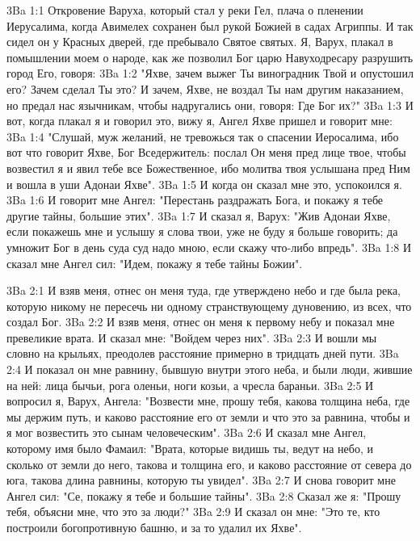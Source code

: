 \vs 3Ba 1:1
Откровение Варуха, который стал у реки Гел, плача о пленении Иерусалима, когда Авимелех сохранен был рукой Божией в садах Агриппы. И так сидел он у Красных дверей, где пребывало Святое святых. Я, Варух, плакал в помышлении моем о народе, как же позволил Бог царю Навуходресару разрушить город Его, говоря:
\vs 3Ba 1:2
"Яхве, зачем выжег Ты виноградник Твой и опустошил его? Зачем сделал Ты это? И зачем, Яхве, не воздал Ты нам другим наказанием, но предал нас язычникам, чтобы надругались они, говоря: Где Бог их?"
\vs 3Ba 1:3
И вот, когда плакал я и говорил это, вижу я, Ангел Яхве пришел и говорит мне:
\vs 3Ba 1:4
"Слушай, муж желаний, не тревожься так о спасении Иеросалима, ибо вот что говорит Яхве, Бог Вседержитель: послал Он меня пред лице твое, чтобы возвестил я и явил тебе все Божественное, ибо молитва твоя услышана пред Ним и вошла в уши Адонаи Яхве".
\vs 3Ba 1:5
И когда он сказал мне это, успокоился я.
\vs 3Ba 1:6
И говорит мне Ангел: "Перестань раздражать Бога, и покажу я тебе другие тайны, большие этих".
\vs 3Ba 1:7
И сказал я, Варух: "Жив Адонаи Яхве, если покажешь мне и услышу я слова твои, уже не буду я больше говорить; да умножит Бог в день суда суд надо мною, если скажу что-либо впредь".
\vs 3Ba 1:8
И сказал мне Ангел сил: "Идем, покажу я тебе тайны Божии".

\vs 3Ba 2:1
И взяв меня, отнес он меня туда, где утверждено небо и где была река, которую никому не пересечь ни одному странствующему дуновению, из всех, что создал Бог.
\vs 3Ba 2:2
И взяв меня, отнес он меня к первому небу и показал мне превеликие врата. И сказал мне: "Войдем через них".
\vs 3Ba 2:3
И вошли мы словно на крыльях, преодолев расстояние примерно в тридцать дней пути.
\vs 3Ba 2:4
И показал он мне равнину, бывшую внутри этого неба, и были люди, жившие на ней: лица бычьи, рога оленьи, ноги козьи, а чресла бараньи.
\vs 3Ba 2:5
И вопросил я, Варух, Ангела: "Возвести мне, прошу тебя, какова толщина неба, где мы держим путь, и каково расстояние его от земли и что это за равнина, чтобы и я мог возвестить это сынам человеческим".
\vs 3Ba 2:6
И сказал мне Ангел, которому имя было Фамаил: "Врата, которые видишь ты, ведут на небо, и сколько от земли до него, такова и толщина его, и каково расстояние от севера до юга, такова длина равнины, которую ты увидел".
\vs 3Ba 2:7
И снова говорит мне Ангел сил: "Се, покажу я тебе и большие тайны".
\vs 3Ba 2:8
Сказал же я: "Прошу тебя, объясни мне, что это за люди?"
\vs 3Ba 2:9
И сказал он мне: "Это те, кто построили богопротивную башню, и за то удалил их Яхве".

